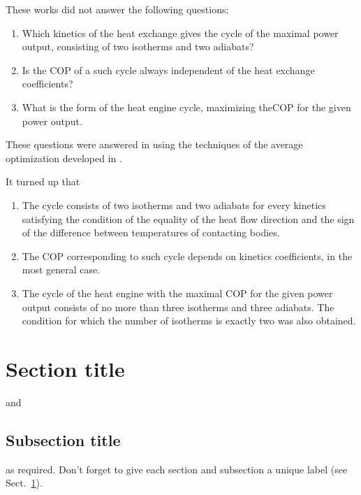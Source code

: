 \documentclass[epjST]{svjour}
\begin{document}
These works did not answer the following questions:
\begin{enumerate}
\item Which kinetics of the heat exchange gives the cycle of the maximal power output, consisting of two isotherms and two adiabats?
\item Is the COP of a such cycle always independent of the heat exchange coefficients?
\item What is the form of the heat engine cycle, maximizing theCOP for the given power output.
\end{enumerate}

These questions were answered in \cite{RosTs}\cite{BeKaSi} using the techniques of the average optimization developed in \cite{Ts1}.

It turned up that
\begin{enumerate}
\item The cycle consists of two isotherms and two adiabats for every kinetics satisfying the condition of the equality of the heat flow direction and the sign of the difference between temperatures of contacting bodies.
\item The COP corresponding to such cycle depends on kinetics coefficients, in the most general case.
\item The cycle of the heat engine with the maximal COP for the given power output consists of no more than three isotherms and three adiabats. The condition for which the number of isotherms is exactly two was also obtained.
\end{enumerate}

\section{Section title}
\label{sec:1}
and \cite{RefJ}
\subsection{Subsection title}
\label{sec:2}
as required. Don't forget to give each section
and subsection a unique label (see Sect.~\ref{sec:1}).
%
\end{document}
